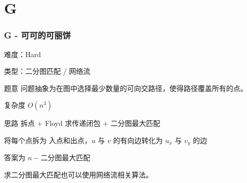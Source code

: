 \section{G}
\begin{frame}
\frametitle{G - 可可的可丽饼}
难度：Hard

类型：二分图匹配 / 网络流

\begin{block}{题意}
    问题抽象为在图中选择最少数量的可向交路径，使得路径覆盖所有的点。
\end{block}

复杂度 $O(n^3)$

\begin{block}{思路}
拆点 + Floyd 求传递闭包 + 二分图最大匹配

将每个点拆为 入点和出点，$u$ 与 $v$ 的有向边转化为 $u_x$ 与 $v_y$ 的边

答案为 $n - \texttt{二分图最大匹配}$

求二分图最大匹配也可以使用网络流相关算法。
\end{block}

\end{frame}